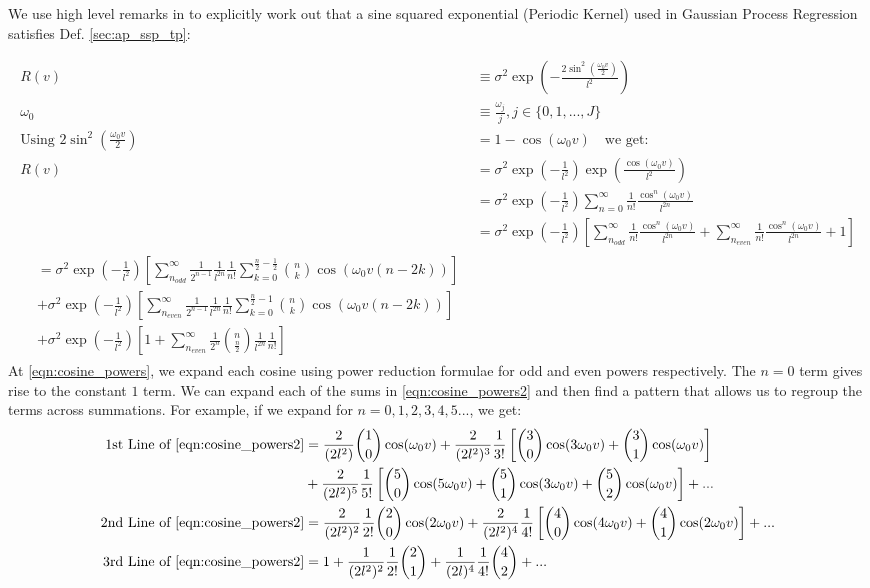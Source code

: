We use high level remarks in \cite{solin2014} to explicitly work out that a sine squared exponential (Periodic Kernel) used in Gaussian Process Regression satisfies Def. \ref{sec:ap_ssp_tp}:

\begin{align}
R(v) &\equiv \sigma^2 \exp (- \frac{2\sin^2(\frac{\omega_0 v}{2})}{l^2}) \\
\omega_0 &\equiv \frac{\omega_j}{j}, j \in \{0, 1,..., J\} \\
\text{Using } 2\sin^2(\frac{\omega_0 v}{2}) &=  1 - \cos(\omega_0 v) \quad \text{we get:}\\
R(v) &=  \sigma^2 \exp (- \frac{1}{l^2}) \exp (\frac{\cos(\omega_0 v)}{l^2}) \\
 &=  \sigma^2 \exp (- \frac{1}{l^2}) \sum_{n = 0}^{\infty} \frac{1}{n!} \frac{\cos^n(\omega_0 v)}{l^{2n}} \label{eqn:periodic_1}\\
&= \sigma^2 \exp (- \frac{1}{l^2}) \left[\sum_{n_{odd}}^{\infty} \frac{1}{n!} \frac{\cos^n(\omega_0 v)}{l^{2n}} + \sum_{n_{even}}^{\infty} \frac{1}{n!} \frac{\cos^n(\omega_0 v)}{l^{2n}} + 1 \right] \label{eqn:cosine_powers} \\ \begin{split} 
& =\sigma^2 \exp (- \frac{1}{l^2})  \left[ \sum_{n_{odd}}^{\infty} \frac{1}{2^{n-1}} \frac{1}{l^{2n}} \frac{1}{n!}  \sum_{k=0}^{\frac{n}{2} - \frac{1}{2}} \binom{n}{k} \cos(\omega_0v (n -2k))\right] \\
& +\sigma^2 \exp (- \frac{1}{l^2})  \left[ \sum_{n_{even}}^{\infty}  \frac{1}{2^{n-1}} \frac{1}{l^{2n}} \frac{1}{n!}  \sum_{k=0}^{\frac{n}{2} - 1} \binom{n}{k} \cos(\omega_0v (n -2k))\right] \\
& +\sigma^2 \exp (- \frac{1}{l^2})  \left[ 1 +  \sum_{n_{even}}^{\infty}  \frac{1}{2^{n}} \binom{n}{\frac{n}{2}} \frac{1}{l^{2n}} \frac{1}{n!} \right] \label{eqn:cosine_powers2}
\end{split} 
\end{align}
At \ref{eqn:cosine_powers}, we expand each cosine using power reduction formulae for odd and even powers respectively. The $n=0$ term gives rise to the constant $1$ term.  We can expand each of the sums in \ref{eqn:cosine_powers2} and then find a pattern that allows us to regroup the terms across summations. For example, if we expand for $n = 0,1,2,3,4,5...$, we get:
\begin{align}
\text{1st Line of \ref{eqn:cosine_powers2}} &= \frac{2}{(2l^2)}\binom{1}{0} \cos(\omega_0 v) + \frac{2}{(2l^2)^3} \frac{1}{3!} \left[\binom{3}{0} \cos(3 \omega_0 v) + \binom{3}{1} \cos(\omega_0v) \right]  \\
&+ \frac{2}{(2l^2)^5} \frac{1}{5!} \left[\binom{5}{0} \cos(5\omega_0v) + \binom{5}{1} \cos(3\omega_0 v) + \binom{5}{2} \cos(\omega_0 v)\right] + ... \\
\text{2nd Line of \ref{eqn:cosine_powers2}} &= \frac{2}{(2l^2)^2} \frac{1}{2!} \binom{2}{0}\cos(2 \omega_0 v) + \frac{2}{(2l^2)^4} \frac{1}{4!} \left[\binom{4}{0} \cos(4 \omega_0 v) + \binom{4}{1} \cos(2 \omega_0 v) \right] + ... \\
\text{3rd Line of \ref{eqn:cosine_powers2}} &=  1 + \frac{1}{(2l^2)^2} \frac{1}{2!} \binom{2}{1} + \frac{1}{(2l)^4} \frac{1}{4!} \binom{4}{2} + ...
\end{align}
